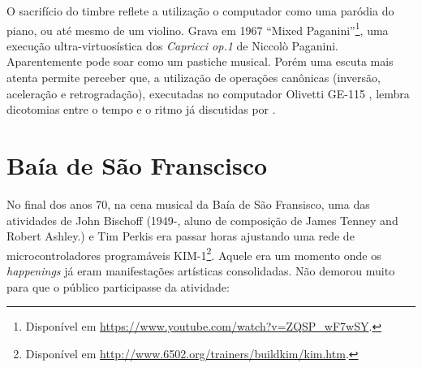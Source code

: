 O sacrifício do timbre reflete a utilização o computador como uma paródia do piano, ou até mesmo de um violino. Grava em 1967 ``Mixed Paganini''\footnote{Disponível em \url{https://www.youtube.com/watch?v=ZQSP_wF7wSY}.}, uma execução ultra-virtuosística dos \emph{Capricci op.1} de Niccolò Paganini. Aparentemente pode soar como um pastiche musical. Porém uma escuta mais atenta permite perceber  que, a utilização de operações canônicas (inversão, aceleração e retrogradação),  executadas no computador Olivetti GE-115 , lembra dicotomias entre o tempo e o ritmo já discutidas por .


\section{Baía de São Franscisco}\label{sec:baiasaofranscisco}

No final dos anos 70, na cena musical da Baía de São Fransisco, uma das atividades de John Bischoff (1949-, aluno de composição de James Tenney and Robert Ashley.) e Tim Perkis  era passar horas ajustando uma rede de microcontroladores programáveis KIM-1\footnote{Disponível em \url{http://www.6502.org/trainers/buildkim/kim.htm}.}. Aquele era um momento onde os \emph{happenings} já eram manifestações artísticas consolidadas. Não demorou muito para que o público participasse da atividade:

